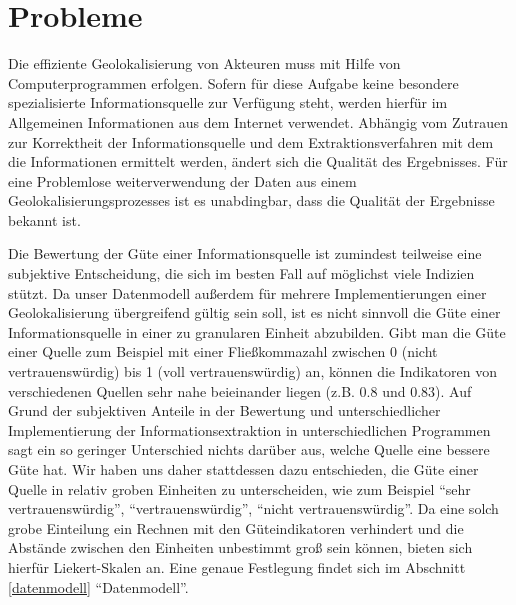 \section{Probleme}
Die effiziente Geolokalisierung von Akteuren muss mit Hilfe von Computerprogrammen erfolgen. Sofern für diese Aufgabe keine besondere spezialisierte Informationsquelle zur Verfügung steht, werden hierfür im Allgemeinen Informationen aus dem Internet verwendet. Abhängig vom Zutrauen zur Korrektheit der Informationsquelle und dem Extraktionsverfahren mit dem die Informationen ermittelt werden, ändert sich die Qualität des Ergebnisses. Für eine Problemlose weiterverwendung der Daten aus einem Geolokalisierungsprozesses ist es unabdingbar, dass die Qualität der Ergebnisse bekannt ist.

Die Bewertung der Güte einer Informationsquelle ist zumindest teilweise eine subjektive Entscheidung, die sich im besten Fall auf möglichst viele Indizien stützt. Da unser Datenmodell außerdem für mehrere Implementierungen einer Geolokalisierung übergreifend gültig sein soll, ist es nicht sinnvoll die Güte einer Informationsquelle in einer zu granularen Einheit abzubilden. Gibt man die Güte einer Quelle zum Beispiel mit einer Fließkommazahl zwischen 0 (nicht vertrauenswürdig) bis 1 (voll vertrauenswürdig) an, können die Indikatoren von verschiedenen Quellen sehr nahe beieinander liegen (z.B. 0.8 und 0.83). Auf Grund der subjektiven Anteile in der Bewertung und unterschiedlicher Implementierung der Informationsextraktion in unterschiedlichen Programmen sagt ein so geringer Unterschied nichts darüber aus, welche Quelle eine bessere Güte hat. Wir haben uns daher stattdessen dazu entschieden, die Güte einer Quelle in relativ groben Einheiten zu unterscheiden, wie zum Beispiel ``sehr vertrauenswürdig'', ``vertrauenswürdig'', ``nicht vertrauenswürdig''. Da eine solch grobe Einteilung ein Rechnen mit den Güteindikatoren verhindert und die Abstände zwischen den Einheiten unbestimmt groß sein können, bieten sich hierfür Liekert-Skalen an. Eine genaue Festlegung findet sich im Abschnitt \ref{datenmodell} ``Datenmodell''.

